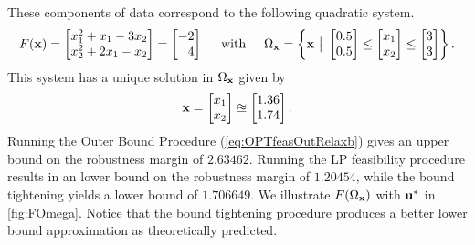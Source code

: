 \medskip
\noindent These components of data correspond to the following quadratic system.
\[
F(\vx) =
\begin{bmatrix}
  x_1^2 +   x_1 - 3x_2 \\
  x_2^2 +  2x_1 - x_2
\end{bmatrix}
=
\begin{bmatrix}
    -2 \\
    \p 4
\end{bmatrix}
\hspace*{0.15in}
\text{ with }
\hspace*{0.15in}
\Omega_{\vx} = \left\{ \vx ~\big\vert~
\begin{bmatrix}
  0.5 \\
  0.5
\end{bmatrix}
\leq 
\begin{bmatrix}
  x_1 \\
  x_2
\end{bmatrix}
\leq
\begin{bmatrix}
  3 \\
  3
\end{bmatrix}
\right\}.
\]
%
This system has a unique solution in $\Omega_{\mathbf{x}}$ given by
\[
\mathbf{x} =
\begin{bmatrix}
x_1 \\
x_2
\end{bmatrix}
\approxeq
\begin{bmatrix}
1.36 \\
1.74
\end{bmatrix}.
\] 
Running the Outer Bound Procedure (\cref{eq:OPTfeasOutRelaxb}) gives an upper bound on the robustness margin of $2.63462$.
Running the LP feasibility procedure results in an lower bound on the robustness margin of $1.20454$, while the bound tightening yields a lower bound of $1.706649$. 
We illustrate $F(\Omega_{\mathbf{x}})$ with $\mathbf{u}^*$ in \cref{fig:FOmega}.
Notice that the bound tightening procedure produces a better lower bound approximation as theoretically predicted.

